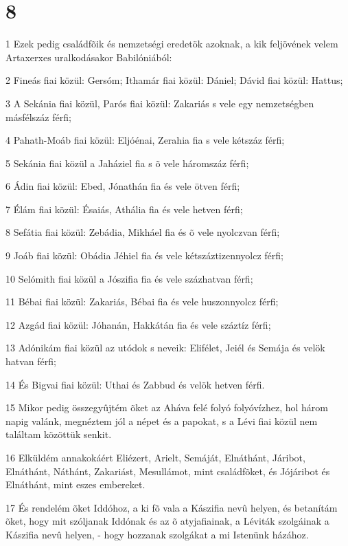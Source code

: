 {\chapter{8}

\par 1 Ezek pedig családfõik és nemzetségi eredetök azoknak, a kik feljövének velem Artaxerxes uralkodásakor Babilóniából:
\par 2 Fineás fiai közül: Gersóm; Ithamár fiai közül: Dániel; Dávid fiai közül: Hattus;
\par 3 A Sekánia fiai közül, Parós fiai közül: Zakariás s vele egy nemzetségben másfélszáz férfi;
\par 4 Pahath-Moáb fiai közül: Eljóénai, Zerahia fia s vele kétszáz férfi;
\par 5 Sekánia fiai közül a Jaháziel fia s õ vele háromszáz férfi;
\par 6 Ádin fiai közül: Ebed, Jónathán fia és vele ötven férfi;
\par 7 Élám fiai közül: Ésaiás, Athália fia és vele hetven férfi;
\par 8 Sefátia fiai közül: Zebádia, Mikháel fia és õ vele nyolczvan férfi;
\par 9 Joáb fiai közül: Obádia Jéhiel fia és vele kétszáztizennyolcz férfi;
\par 10 Selómith fiai közül a Jószifia fia és vele százhatvan férfi;
\par 11 Bébai fiai közül: Zakariás, Bébai fia és vele huszonnyolcz férfi;
\par 12 Azgád fiai közül: Jóhanán, Hakkátán fia és vele száztíz férfi;
\par 13 Adónikám fiai közül az utódok s neveik: Elifélet, Jeiél és Semája és velök hatvan férfi;
\par 14 És Bigvai fiai közül: Uthai és Zabbud és velök hetven férfi.
\par 15 Mikor pedig összegyûjtém õket az Aháva felé folyó folyóvízhez, hol három napig valánk, megnéztem jól a népet és a papokat, s a Lévi fiai közül nem találtam közöttük senkit.
\par 16 Elküldém annakokáért Eliézert, Arielt, Semáját, Elnáthánt, Járibot, Elnáthánt, Náthánt, Zakariást, Mesullámot, mint családfõket, és Jójáribot és Elnáthánt, mint eszes embereket.
\par 17 És rendelém õket Iddóhoz, a ki fõ vala a Kászifia nevû helyen, és betanítám õket, hogy mit szóljanak Iddónak és az õ atyjafiainak, a Léviták szolgáinak a Kászifia nevû helyen, - hogy hozzanak szolgákat a mi Istenünk házához.
}
